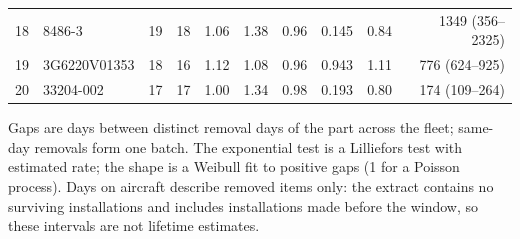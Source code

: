 \begin{table}[htbp]
{\begin{tabular}{rlrrrrrrrr}
18 & 8486-3 & 19 & 18 & 1.06 & 1.38 & 0.96 & 0.145 & 0.84 & 1349 (356--2325) \\
19 & 3G6220V01353 & 18 & 16 & 1.12 & 1.08 & 0.96 & 0.943 & 1.11 & 776 (624--925) \\
20 & 33204-002 & 17 & 17 & 1.00 & 1.34 & 0.98 & 0.193 & 0.80 & 174 (109--264) \\
\bottomrule
\end{tabular}}
\par\smallskip
{\footnotesize Gaps are days between distinct removal days of the part across the fleet; same-day removals form one batch. The exponential test is a Lilliefors test with estimated rate; the shape is a Weibull fit to positive gaps (1 for a Poisson process). Days on aircraft describe removed items only: the extract contains no surviving installations and includes installations made before the window, so these intervals are not lifetime estimates.}
\end{table}
